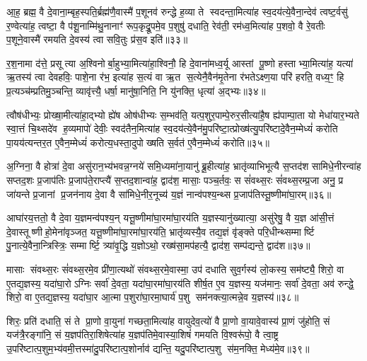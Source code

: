 आ॒ह॒ ब्रह्म॒ वै दे॒वाना॒म्बृह॒स्पति॒र्ब्रह्म॑णै॒वास्मै॑ प॒शूनव॑ रुन्द्धे ह॒व्या ते स्वदन्ता॒मित्या॑ह स्व॒दय॑त्ये॒वैना॒न्देव॑ त्वष्ट॒र्वसु॑ र॒ण्वेत्या॑ह॒ त्वष्टा॒ वै प॑शू॒नाम्मि॑थु॒नानाꣳ॑ रूप॒कृद्रू॒पमे॒व प॒शुषु॑ दधाति॒ रेव॑ती॒ रम॑ध्व॒मित्या॑ह प॒शवो॒ वै रे॒वतीः प॒शूने॒वास्मै॑ रमयति दे॒वस्य॑ त्वा सवि॒तुः प्र॑स॒व इति॑॥३३॥

र॒श॒नामा द॑त्ते॒ प्रसूत्या अ॒श्विनोर्बा॒हुभ्या॒मित्या॑हा॒श्विनौ॒ हि दे॒वाना॑मध्व॒र्यू आस्तां पू॒ष्णो हस्ताभ्या॒मित्या॑ह॒ यत्या॑ ऋ॒तस्य॑ त्वा देवहविः॒ पाशे॒ना र॑भ॒ इत्या॑ह स॒त्यं वा ऋ॒त स॒त्येनै॒वैन॑मृ॒तेना र॑भतेऽक्ष्ण॒या परि॑ हरति॒ वध्य॒ꣳ॒ हि प्र॒त्यञ्च॑म्प्रतिमु॒ञ्चन्ति॒ व्यावृ॑त्त्यै॒ धर्\mbox{}षा॒ मानु॑षा॒निति॒ नि यु॑नक्ति॒ धृत्या॑ अ॒द्भ्यः॥३४॥

त्वौष॑धीभ्यः॒ प्रोख्षा॒मीत्या॑हा॒द्भ्यो ह्ये॑ष ओष॑धीभ्यः स॒म्भव॑ति॒ यत्प॒शुर॒पाम्पे॒रुर॒सीत्या॑है॒ष ह्य॑पाम्पा॒ता यो मेधा॑यार॒भ्यते स्वा॒त्तं चि॒थ्सदे॑व ह॒व्यमापो॑ देवीः॒ स्वद॑तैन॒मित्या॑ह स्व॒दय॑त्ये॒वैन॑मु॒परि॑ष्टा॒त्प्रोख्ष॑त्यु॒परि॑ष्टादे॒वैन॒म्मेध्यं॑ करोति पा॒यय॑त्यन्तर॒त ए॒वैन॒म्मेध्यं॑ करोत्य॒धस्ता॒दुपोख्षति स॒र्वत॑ ए॒वैन॒म्मेध्यं॑ करोति॥३५॥

{\anuvakamend[{वसू॒निति॑ प्रस॒व इत्य॒द्भ्योऽन्तर॒त ए॒वैन॒न्दश॑ च॥६॥}]}

अ॒ग्निना॒ वै होत्रा॑ दे॒वा असु॑रान॒भ्य॑भवन्न॒ग्नये॑ समि॒ध्यमा॑ना॒यानु॑ ब्रू॒हीत्या॑ह॒ भ्रातृ॑व्याभिभूत्यै स॒प्तद॑श सामिधे॒नीरन्वा॑ह सप्तद॒शः प्र॒जाप॑तिः प्र॒जाप॑ते॒राप्त्यै॑ स॒प्तद॒शान्वा॑ह॒ द्वाद॑श॒ मासाः॒ पञ्च॒र्तवः॒ स सं॑वथ्स॒रः सं॑वथ्स॒रम्प्र॒जा अनु॒ प्र जा॑यन्ते प्र॒जानां प्र॒जन॑नाय दे॒वा वै सा॑मिधे॒नीर॒नूच्य॑ य॒ज्ञं नान्व॑पश्य॒न्थ्स प्र॒जाप॑तिस्तू॒ष्णीमा॑घा॒रम्॥३६॥

आघा॑रय॒त्ततो॒ वै दे॒वा य॒ज्ञमन्व॑पश्य॒न् यत्तू॒ष्णीमा॑घा॒रमा॑घा॒रय॑ति य॒ज्ञस्यानु॑ख्यात्या॒ असु॑रेषु॒ वै य॒ज्ञ आ॑सी॒त्तं दे॒वास्तूष्णीहो॒मेना॑वृञ्जत॒ यत्तू॒ष्णीमा॑घा॒रमा॑घा॒रय॑ति॒ भ्रातृ॑व्यस्यै॒व तद्य॒ज्ञं वृ॑ङ्क्ते परि॒धीन्थ्सम्मार्ष्टि पु॒नात्ये॒वैना॒न्त्रिस्त्रिः॒ सम्मार्ष्टि॒ त्र्या॑वृ॒द्धि य॒ज्ञोऽथो॒ रख्ष॑सा॒मप॑हत्यै॒ द्वाद॑श॒ सम्प॑द्यन्ते॒ द्वाद॑श॥३७॥

मासाः संवथ्स॒रः सं॑वथ्स॒रमे॒व प्री॑णा॒त्यथो॑ संवथ्स॒रमे॒वास्मा॒ उप॑ दधाति सुव॒र्गस्य॑ लो॒कस्य॒ सम॑ष्ट्यै॒ शिरो॒ वा ए॒तद्य॒ज्ञस्य॒ यदा॑घा॒रोऽग्निः सर्वा॑ दे॒वता॒ यदा॑घा॒रमा॑घा॒रय॑ति शीर्\mbox{}ष॒त ए॒व य॒ज्ञस्य॒ यज॑मानः॒ सर्वा॑ दे॒वता॒ अव॑ रुन्द्धे॒ शिरो॒ वा ए॒तद्य॒ज्ञस्य॒ यदा॑घा॒र आ॒त्मा प॒शुरा॑घा॒रमा॒घार्य॑ प॒शु सम॑नक्त्या॒त्मन्ने॒व य॒ज्ञस्य॑॥३८॥

शिरः॒ प्रति॑ दधाति॒ सं ते प्रा॒णो वा॒युना॑ गच्छता॒मित्या॑ह वायुदेव॒त्यो॑ वै प्रा॒णो वा॒यावे॒वास्य॑ प्रा॒णं जु॑होति॒ सं यज॑त्रै॒रङ्गा॑नि॒ सं य॒ज्ञप॑तिरा॒शिषेत्या॑ह य॒ज्ञप॑तिमे॒वास्या॒शिषं॑ गमयति वि॒श्वरू॑पो॒ वै त्वा॒ष्ट्र उ॒परि॑ष्टात्प॒शुम॒भ्य॑वमी॒त्तस्मा॑दु॒परि॑ष्टात्प॒शोर्नाव॑ द्यन्ति॒ यदु॒परि॑ष्टात्प॒शु स॑म॒नक्ति॒ मेध्य॑मे॒व॥३९॥

